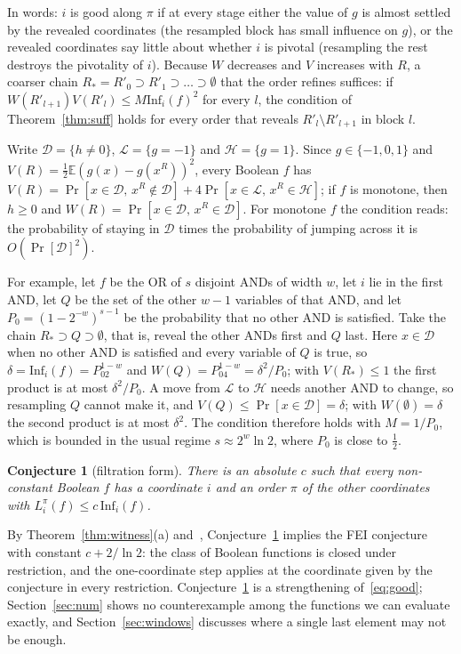 \documentclass[11pt]{amsart}
\newtheorem{conjecture}[theorem]{Conjecture}
\theoremstyle{remark}
\newcommand{\Inf}{\mathrm{Inf}}
\newcommand{\E}{\mathbb{E}}
\begin{document}
In words: $i$ is good along $\pi$ if at every stage either the value of $g$ is almost settled by the revealed
coordinates (the resampled block has small influence on $g$), or the revealed coordinates say little about whether $i$
is pivotal (resampling the rest destroys the pivotality of $i$). Because $W$ decreases and $V$ increases with $R$, a coarser
chain $R_*=R'_0\supset R'_1\supset\dots\supset\emptyset$ that the order refines suffices: if
$W(R'_{l+1})V(R'_l)\le M\Inf_i(f)^2$ for every $l$, the condition of Theorem~\ref{thm:suff} holds for every order that
reveals $R'_l\setminus R'_{l+1}$ in block $l$.

Write $\mathcal D=\{h\ne0\}$, $\mathcal L=\{g=-1\}$ and $\mathcal H=\{g=1\}$. Since $g\in\{-1,0,1\}$ and
$V(R)=\tfrac12\E(g(x)-g(x^R))^2$, every Boolean $f$ has $V(R)=\Pr[x\in\mathcal D,\,x^R\notin\mathcal D]+
4\Pr[x\in\mathcal L,\,x^R\in\mathcal H]$; if $f$ is monotone, then $h\ge0$ and $W(R)=\Pr[x\in\mathcal D,\,x^R\in\mathcal D]$.
For monotone $f$ the condition reads: the probability of staying in $\mathcal D$ times the probability of jumping
across it is $O(\Pr[\mathcal D]^2)$.

For example, let $f$ be the OR of $s$ disjoint ANDs of width $w$, let $i$ lie in the first AND, let $Q$ be the set of
the other $w-1$ variables of that AND, and let $P_0=(1-2^{-w})^{s-1}$ be the probability that no other AND is
satisfied. Take the chain $R_*\supset Q\supset\emptyset$, that is, reveal the other ANDs first and $Q$ last. Here
$x\in\mathcal D$ when no other AND is satisfied and every variable of $Q$ is true, so $\delta=\Inf_i(f)=P_02^{1-w}$ and
$W(Q)=P_04^{1-w}=\delta^2/P_0$; with $V(R_*)\le1$ the first product is at most $\delta^2/P_0$. A move from $\mathcal L$ to
$\mathcal H$ needs another AND to change, so resampling $Q$ cannot make it, and $V(Q)\le\Pr[x\in\mathcal D]=\delta$; with
$W(\emptyset)=\delta$ the second product is at most $\delta^2$. The condition therefore holds with $M=1/P_0$, which is
bounded in the usual regime $s\approx2^w\ln2$, where $P_0$ is close to $\tfrac12$.

\begin{conjecture}[filtration form]\label{conj:fwc}
There is an absolute $c$ such that every non-constant Boolean $f$ has a coordinate $i$ and an order $\pi$ of the other
coordinates with $L^\pi_i(f)\le c\,\Inf_i(f)$.
\end{conjecture}

By Theorem~\ref{thm:witness}(a) and~\cite{Shm1}, Conjecture~\ref{conj:fwc} implies the FEI conjecture with constant
$c+2/\ln2$: the class of Boolean functions is closed under restriction, and the one-coordinate step applies at the
coordinate given by the conjecture in every restriction. Conjecture~\ref{conj:fwc} is a strengthening of~\eqref{eq:good};
Section~\ref{sec:num} shows no counterexample among the functions we can evaluate exactly, and Section~\ref{sec:windows}
discusses where a single last element may not be enough.
\end{document}

